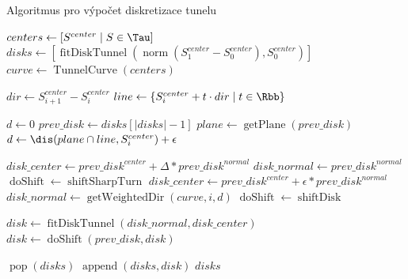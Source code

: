 \begin{algorithm}
\caption{Algoritmus pro výpočet diskretizace tunelu}
\label{alg:digTunnel}
\begin{algorithmic}[1]

    \State $ centers \gets [ S^{center} \mid S \in \Tau ] $ \label{digTunnel:first_init}
    \
    \State $ disks \gets   [ \operatorname{fitDiskTunnel}(\operatorname{norm}(S_{1}^{center} - S_{0}^{center}), S_0^{center})] $
    \State $ curve \gets \operatorname{TunnelCurve}(centers) $ \label{digTunnel:last_init}
    \Statex

        \State $ dir \gets S_{i + 1}^{center} - S_{i}^{center} $
        \State $ line \gets \{ S_{i}^{center} + t\cdot dir \mid t \in \Rbb \} $

        \State $ d \gets 0 $
            \State $ prev\_disk \gets disks[|disks|-1] $
            \State $ plane \gets \operatorname{getPlane}(prev\_disk) $ 
            \State $ d \gets \dis(plane \cap line, S_{i}^{center}) + \epsilon  $
            \If {$ d > \norm{dir} $} \label{digTunnel:while_condition}
                \Break
            \EndIf
            \Statex

                \State $ disk\_center
                    \gets prev\_disk^{center} + \Delta * prev\_disk^{normal} $ \label{alg:shift_by_delta}
                \State $ disk\_normal \gets prev\_disk^{normal} $   \label{alg:same_normal}
                \State $ \operatorname{doShift} \gets \operatorname{shiftSharpTurn} $
            \Else
                \State $ disk\_center \gets prev\_disk^{center} + \epsilon * prev\_disk^{normal} $
                \State $ disk\_normal \gets \operatorname{getWeightedDir}(curve, i, d) $
                \State $ \operatorname{doShift} \gets \operatorname{shiftDisk} $
            \EndIf

            \State $ disk \gets \operatorname{fitDiskTunnel}(disk\_normal, disk\_center) $ \label{alg:fit_disk}
            \State $ disk \gets \operatorname{doShift}(prev\_disk, disk) $ \label{alg:shift_disk}

             \label{digTunnel:last_if}
                \State $ \operatorname{pop}(disks)  $ \label{digTunnel:last_if_end}
            \EndIf
            \State $ \operatorname{append}(disks, disk) $
        \EndWhile
    \EndFor
    \State \Return $ disks $
\EndFunction

\end{algorithmic}
\end{algorithm}

